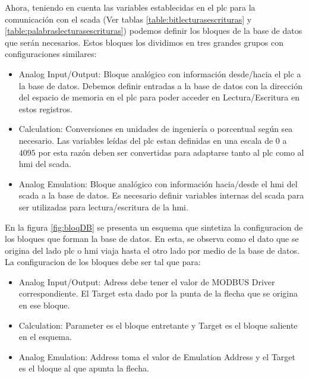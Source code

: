 Ahora, teniendo en cuenta las variables establecidas en el \gls{plc} 
para la comunicación con el \gls{scada} (Ver 
tablas \ref{table:bitlecturasescrituras} y 
\ref{table:palabraslecturasescrituras}) podemos definir los bloques de la base 
de datos que serán necesarios. Estos bloques los dividimos en tres 
grandes grupos con configuraciones similares:
 
\begin{itemize}
 \item Analog Input/Output: Bloque analógico con información desde/hacia el 
  \gls{plc} a la base de datos. Debemos definir entradas a la base de datos con 
  la dirección del espacio de memoria en el \gls{plc} para poder acceder en 
  Lectura/Escritura en estos registros.
 \item Calculation:  Conversiones en unidades de ingeniería o porcentual 
  según sea necesario. Las variables leídas del \gls{plc} estan definidas en 
  una escala de $0$ a $4095$ por esta razón deben ser convertidas para
adaptarse tanto al \gls{plc} como al \gls{hmi} del \gls{scada}.
 \item Analog Emulation: Bloque analógico con información hacia/desde el 
  \gls{hmi} del \gls{scada} a la base de datos. Es necesario definir variables 
  internas del \gls{scada} para ser utilizadas para lectura/escritura de la 
  \gls{hmi}.
\end{itemize}

En la figura \ref{fig:bloqDB} se presenta un esquema que sintetiza la 
configuracion de los bloques que forman la base de datos. En esta, se observa 
como el dato que se origina del lado \gls{plc} o \gls{hmi} viaja hasta el otro 
lado por medio de la base de datos.
La configuracion de los bloques debe ser tal que para:
\begin{itemize}
  \item Analog Input/Output: Adress debe tener el valor de MODBUS Driver 
  correspondiente. El Target esta dado por la punta de la flecha que se origina 
  en ese bloque.
  \item Calculation: Parameter es el bloque entretante y Target es el bloque 
  saliente en el esquema.
  \item Analog Emulation: Address toma el valor de Emulation Address y el 
  Target es el bloque al que apunta la flecha. 
\end{itemize}



